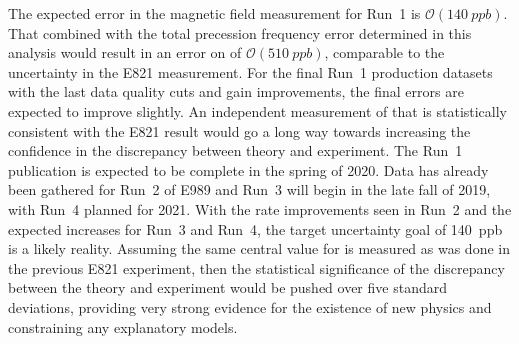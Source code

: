The expected error in the magnetic field measurement for Run~1 is $\mathcal{O}(\SI{140}{ppb})$. That combined with the total precession frequency error determined in this analysis would result in an error on \amu of $\mathcal{O}(\SI{510}{ppb})$, comparable to the uncertainty in the E821 measurement. For the final Run~1 production datasets with the last data quality cuts and gain improvements, the final errors are expected to improve slightly. An independent measurement of \amu that is statistically consistent with the E821 result would go a long way towards increasing the confidence in the discrepancy between theory and experiment. The Run~1 publication is expected to be complete in the spring of 2020. Data has already been gathered for Run~2 of E989 and Run~3 will begin in the late fall of 2019, with Run~4 planned for 2021. With the rate improvements seen in Run~2 and the expected increases for Run~3 and Run~4, the target uncertainty goal of \SI{140}{ppb} is a likely reality. Assuming the same central value for \amu is measured as was done in the previous E821 experiment, then the statistical significance of the discrepancy between the theory and experiment would be pushed over five standard deviations, providing very strong evidence for the existence of new physics and constraining any explanatory models.






